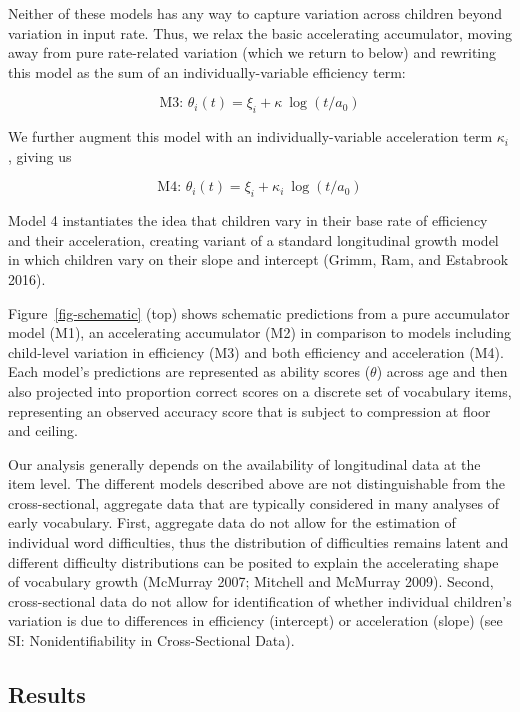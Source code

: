 \documentclass[
  11pt,
]{article}
\begin{document}
Neither of these models has any way to capture variation across children
beyond variation in input rate. Thus, we relax the basic accelerating
accumulator, moving away from pure rate-related variation (which we
return to below) and rewriting this model as the sum of an
individually-variable efficiency term:

\[\text{M3: }\theta_i(t) = \xi_i + \kappa ~ \log(t/a_0)\]

We further augment this model with an individually-variable acceleration
term \(\kappa_i\), giving us

\[\text{M4: }\theta_i(t) = \xi_i + \kappa_i ~ \log(t/a_0)\]

Model 4 instantiates the idea that children vary in their base rate of
efficiency and their acceleration, creating variant of a standard
longitudinal growth model in which children vary on their slope and
intercept (Grimm, Ram, and Estabrook 2016).

Figure~\ref{fig-schematic} (top) shows schematic predictions from a pure
accumulator model (M1), an accelerating accumulator (M2) in comparison
to models including child-level variation in efficiency (M3) and both
efficiency and acceleration (M4). Each model's predictions are
represented as ability scores (\(\theta\)) across age and then also
projected into proportion correct scores on a discrete set of vocabulary
items, representing an observed accuracy score that is subject to
compression at floor and ceiling.

Our analysis generally depends on the availability of longitudinal data
at the item level. The different models described above are not
distinguishable from the cross-sectional, aggregate data that are
typically considered in many analyses of early vocabulary. First,
aggregate data do not allow for the estimation of individual word
difficulties, thus the distribution of difficulties remains latent and
different difficulty distributions can be posited to explain the
accelerating shape of vocabulary growth (McMurray 2007; Mitchell and
McMurray 2009). Second, cross-sectional data do not allow for
identification of whether individual children's variation is due to
differences in efficiency (intercept) or acceleration (slope) (see SI:
Nonidentifiability in Cross-Sectional Data).

\subsection{Results}\label{results}
\end{document}
